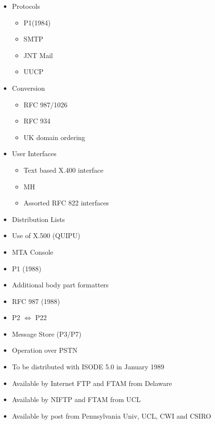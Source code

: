 \begin {bwslide}
\begin {itemize}
\item Protocols
\begin {itemize}
\item P1(1984)
\item SMTP
\item JNT Mail
\item UUCP
\end {itemize}

\item Conversion
\begin {itemize}
\item RFC 987/1026
\item RFC 934
\item UK domain ordering
\end {itemize}

\item User Interfaces
\begin {itemize}
\item Text based X.400 interface
\item MH
\item Assorted RFC 822 interfaces
\end {itemize}

\item Distribution Lists

\item Use of X.500 (QUIPU)

\end {itemize}

\end {bwslide}


\begin {bwslide}
\begin {itemize}
\item MTA Console
\item P1 (1988)
\item Additional body part formatters
\item RFC 987 (1988)
\item P2 $\Leftrightarrow$ P22
\item Message Store (P3/P7)
\item Operation over PSTN
\end {itemize}

\end {bwslide}


\begin {bwslide}
\begin {itemize}
\item To be distributed with ISODE 5.0 in January 1989
\item Available by Internet FTP and FTAM from Delaware
\item Available by NIFTP and FTAM from UCL
\item Available by post from Pennsylvania Univ, UCL, CWI and CSIRO
\end {itemize}

\end {bwslide}


